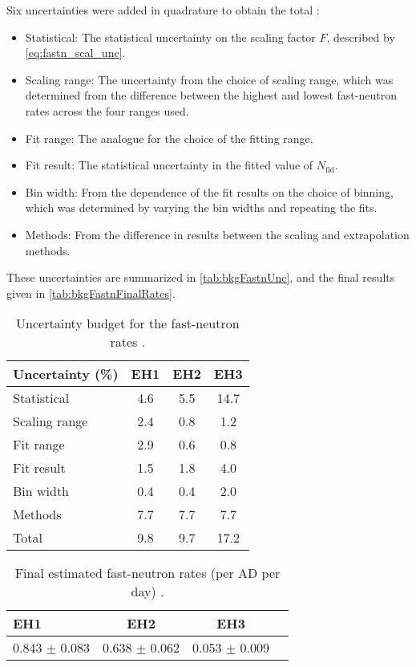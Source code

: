\documentclass[../thesis.tex]{subfiles}
\begin{document}
Six uncertainties were added in quadrature to obtain the total \cite{fastn}:
\begin{itemize}
\item Statistical: The statistical uncertainty on the scaling factor $F$, described by \autoref{eq:fastn_scal_unc}.
\item Scaling range: The uncertainty from the choice of scaling range, which was determined from the difference between the highest and lowest fast-neutron rates across the four ranges used.
\item Fit range: The analogue for the choice of the fitting range.
\item Fit result: The statistical uncertainty in the fitted value of $N_\mathrm{fid}$.
\item Bin width: From the dependence of the fit results on the choice of binning, which was determined by varying the bin widths and repeating the fits.
\item Methods: From the difference in results between the scaling and extrapolation methods.
\end{itemize}
These uncertainties are summarized in \autoref{tab:bkgFastnUnc}, and the final results given in \autoref{tab:bkgFastnFinalRates}.

\begin{table}[ht]
  \begin{tabular}{lccc}
    \toprule
    Uncertainty (\%)            & EH1  & EH2  & EH3 \\
    \midrule
    Statistical & 4.6 & 5.5 & 14.7 \\
    Scaling range & 2.4 & 0.8 & 1.2 \\
    Fit range & 2.9 & 0.6 & 0.8 \\
    Fit result & 1.5 & 1.8 & 4.0 \\
    Bin width & 0.4 & 0.4 & 2.0 \\
    Methods & 7.7 & 7.7 & 7.7 \\
    \midrule
    Total & 9.8 & 9.7 & 17.2 \\
    \bottomrule
  \end{tabular}
  \caption{Uncertainty budget for the fast-neutron rates \cite{fastn}.}
  \label{tab:bkgFastnUnc}
\end{table}

\begin{table}[ht]
  \begin{tabular}{lccc}
    \toprule
    EH1 & EH2 & EH3 \\
    \midrule
    0.843 $\pm$ 0.083 & 0.638 $\pm$ 0.062 & 0.053 $\pm$ 0.009 \\
    \bottomrule
  \end{tabular}
  \caption{Final estimated fast-neutron rates (per AD per day) \cite{fastn}.}
  \label{tab:bkgFastnFinalRates}
\end{table}
\end{document}
